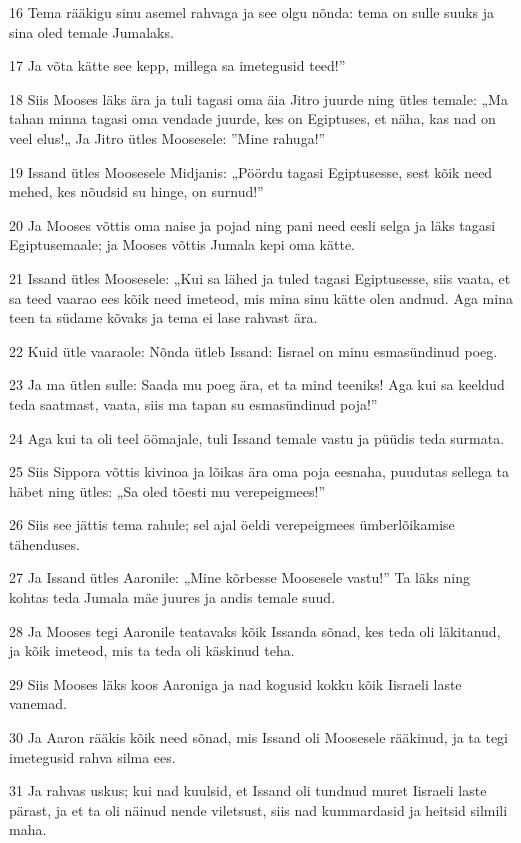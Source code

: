 \par 16 Tema rääkigu sinu asemel rahvaga ja see olgu nõnda: tema on sulle suuks ja sina oled temale Jumalaks.
\par 17 Ja võta kätte see kepp, millega sa imetegusid teed!”
\par 18 Siis Mooses läks ära ja tuli tagasi oma äia Jitro juurde ning ütles temale: „Ma tahan minna tagasi oma vendade juurde, kes on Egiptuses, et näha, kas nad on veel elus!„ Ja Jitro ütles Moosesele: ”Mine rahuga!”
\par 19 Issand ütles Moosesele Midjanis: „Pöördu tagasi Egiptusesse, sest kõik need mehed, kes nõudsid su hinge, on surnud!”
\par 20 Ja Mooses võttis oma naise ja pojad ning pani need eesli selga ja läks tagasi Egiptusemaale; ja Mooses võttis Jumala kepi oma kätte.
\par 21 Issand ütles Moosesele: „Kui sa lähed ja tuled tagasi Egiptusesse, siis vaata, et sa teed vaarao ees kõik need imeteod, mis mina sinu kätte olen andnud. Aga mina teen ta südame kõvaks ja tema ei lase rahvast ära.
\par 22 Kuid ütle vaaraole: Nõnda ütleb Issand: Iisrael on minu esmasündinud poeg.
\par 23 Ja ma ütlen sulle: Saada mu poeg ära, et ta mind teeniks! Aga kui sa keeldud teda saatmast, vaata, siis ma tapan su esmasündinud poja!”
\par 24 Aga kui ta oli teel öömajale, tuli Issand temale vastu ja püüdis teda surmata.
\par 25 Siis Sippora võttis kivinoa ja lõikas ära oma poja eesnaha, puudutas sellega ta häbet ning ütles: „Sa oled tõesti mu verepeigmees!”
\par 26 Siis see jättis tema rahule; sel ajal öeldi verepeigmees ümberlõikamise tähenduses.
\par 27 Ja Issand ütles Aaronile: „Mine kõrbesse Moosesele vastu!” Ta läks ning kohtas teda Jumala mäe juures ja andis temale suud.
\par 28 Ja Mooses tegi Aaronile teatavaks kõik Issanda sõnad, kes teda oli läkitanud, ja kõik imeteod, mis ta teda oli käskinud teha.
\par 29 Siis Mooses läks koos Aaroniga ja nad kogusid kokku kõik Iisraeli laste vanemad.
\par 30 Ja Aaron rääkis kõik need sõnad, mis Issand oli Moosesele rääkinud, ja ta tegi imetegusid rahva silma ees.
\par 31 Ja rahvas uskus; kui nad kuulsid, et Issand oli tundnud muret Iisraeli laste pärast, ja et ta oli näinud nende viletsust, siis nad kummardasid ja heitsid silmili maha.

